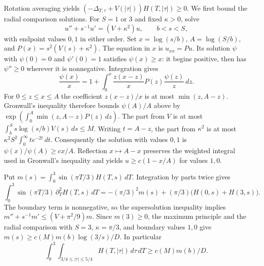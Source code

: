 Rotation averaging yields
\((-\Delta_{T,\tau}+V(|\tau|))H(T,|\tau|)\ge0\).
We first bound the radial comparison solutions. For \(S=1\) or \(3\)
and fixed \(\kappa>0\), solve
\[
 u''+s^{-1}u'=(V+\kappa^2)u,\qquad b<s<S,
\]
with endpoint values \(0,1\) in either order.
Set \(x=\log(s/b)\), \(A=\log(S/b)\), and
\(P(x)=s^2(V(s)+\kappa^2)\). The equation in \(x\) is \(u_{xx}=Pu\).
Its solution \(\psi\) with \(\psi(0)=0\) and \(\psi'(0)=1\)
satisfies \(\psi(x)\ge x\): it begins positive, then has
\(\psi''\ge0\) wherever it is nonnegative. Integration gives
\[
 \frac{\psi(x)}x=1+\int_0^x \frac{z(x-z)}x
                  P(z)\frac{\psi(z)}z\,dz .
\]
For \(0\le z\le x\le A\) the coefficient \(z(x-z)/x\) is at most
\(\min(z,A-z)\). Gronwall's inequality therefore bounds
\(\psi(A)/A\) above by
\(\exp(\int_0^A\min(z,A-z)P(z)\,dz)\).
The part from \(V\) is at most
\(\int_b^S s\log(s/b)V(s)\,ds\le M\).
Writing \(t=A-z\), the part from \(\kappa^2\) is at most
\(\kappa^2S^2\int_0^\infty t e^{-2t}\,dt\).
Consequently the solution with values \(0,1\) is
\(\psi(x)/\psi(A)\ge c x/A\). Reflection \(x\mapsto A-x\)
preserves the weighted integral used in Gronwall's inequality
and yields \(u\ge c(1-x/A)\) for values \(1,0\).

Put \(m(s)=\int_0^3\sin(\pi T/3)H(T,s)\,dT\).
Integration by parts twice gives
\[
 \int_0^3\sin(\pi T/3)\,\partial_T^2H(T,s)\,dT
   =-(\pi/3)^2m(s)+(\pi/3)\big(H(0,s)+H(3,s)\big).
\]
The boundary term is nonnegative, so the supersolution inequality
implies \(m''+s^{-1}m'\le(V+\pi^2/9)m\).
Since \(m(3)\ge0\), the maximum principle and the radial
comparison with \(S=3\), \(\kappa=\pi/3\), and boundary values
\(1,0\) give \(m(s)\ge c(M)m(b)\log(3/s)/D\). In particular
\[
 \int_0^3\int_{3/4\le|\tau|\le5/4}H(T,|\tau|)\,d\tau\,dT
 \ge c(M)m(b)/D.
\]

